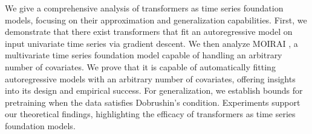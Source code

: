 We give a comprehensive analysis of transformers as time series foundation models, focusing on their approximation and generalization capabilities. 
First, we demonstrate that there exist transformers that fit an autoregressive model on input univariate time series via gradient descent. 
We then analyze MOIRAI \cite{woo2024unified}, a multivariate time series foundation model capable of handling an arbitrary number of covariates. 
We prove that it is capable of automatically fitting autoregressive models with an arbitrary number of covariates, offering insights into its design and empirical success.   
For generalization, we establish bounds for pretraining when the data satisfies Dobrushin’s condition. 
Experiments support our theoretical findings, highlighting the efficacy of transformers as time series foundation models.
